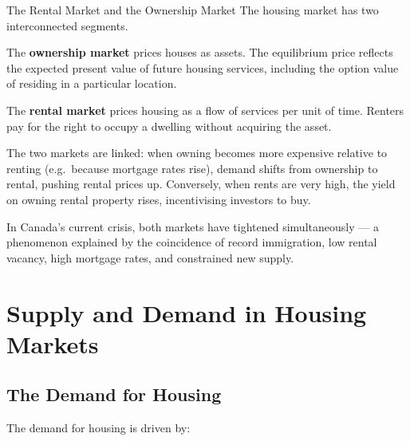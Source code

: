 \begin{defbox}{The Rental Market and the Ownership Market}
The housing market has two interconnected segments.

The \textbf{ownership market} prices houses as assets. The equilibrium
price reflects the expected present value of future housing services,
including the option value of residing in a particular location.

The \textbf{rental market} prices housing as a flow of services per unit
of time. Renters pay for the right to occupy a dwelling without acquiring
the asset.

The two markets are linked: when owning becomes more expensive relative
to renting (e.g.\ because mortgage rates rise), demand shifts from
ownership to rental, pushing rental prices up. Conversely, when rents
are very high, the yield on owning rental property rises, incentivising
investors to buy.

In Canada's current crisis, both markets have tightened simultaneously ---
a phenomenon explained by the coincidence of record immigration, low rental
vacancy, high mortgage rates, and constrained new supply.
\end{defbox}

\section{Supply and Demand in Housing Markets}
\label{sec:housing_supply_demand}

\subsection{The Demand for Housing}

The demand for housing is driven by:

